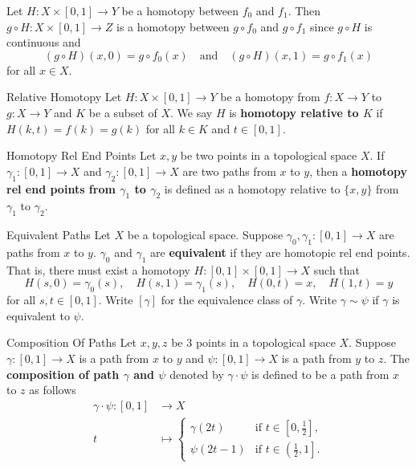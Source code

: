 \documentclass{report}
\begin{document}
\begin{prf}
	Let $H:X\times [0,1]\to Y$ be a homotopy between $f_0$ and $f_1$. Then $g\circ H:X\times [0,1]\to Z$ is a homotopy between $g\circ f_0$ and $g\circ f_1$ since $g\circ H$ is continuous and
	\[
		(g\circ H)(x,0)=g\circ f_0(x)\quad\text{and}\quad (g\circ H)(x,1)=g\circ f_1(x)
	\]
	for all $x\in X$.
\end{prf}

\begin{definition}{Relative Homotopy}{}
	Let $H: X \times[0,1] \rightarrow Y$ be a homotopy from $f:X\to Y$ to $g:X\to Y$ and $K$ be a subset of $X$. We say $H$ is \textbf{homotopy relative to $K$} if $H(k, t)=f(k)=g(k)$ for all $k \in K$ and $t \in[0,1]$.
\end{definition}

\begin{definition}{Homotopy Rel End Points}{}
	Let $x,y$ be two points in a topological space $X$. If $\gamma_1:[0,1]\to X$ and $\gamma_2:[0,1]\to X$ are two paths from $x$ to $y$, then a \textbf{homotopy rel end points from $\gamma_1$ to $\gamma_2$} is defined as a homotopy relative to $\{x, y\}$ from $\gamma_1$ to $\gamma_2$.
\end{definition}

\begin{definition}{Equivalent Paths}{}
	Let $X$ be a topological space. Suppose $\gamma_0,\gamma_1: [0,1] \longrightarrow X$ are paths from $x$ to $y$. $\gamma_0$ and $\gamma_1$ are \textbf{equivalent} if they are homotopic rel end points. That is, there must exist a homotopy $H: [0,1] \times [0,1] \longrightarrow X$ such that
	$$
		H(s, 0)=\gamma_0(s), \quad H(s, 1)=\gamma_1(s), \quad H(0, t)=x, \quad H(1, t)=y
	$$
	for all $s,t \in [0,1]$. Write $[\gamma]$ for the equivalence class of $\gamma$. Write $\gamma\sim \psi$ if $\gamma$ is equivalent to $\psi$.
\end{definition}


\begin{definition}{Composition Of Paths}{}
	Let $x,y,z$ be $3$ points in a topological space $X$. Suppose $\gamma: [0,1] \longrightarrow X$ is a path from $x$ to $y$ and $\psi: [0,1] \longrightarrow X$ is a path from $y$ to $z$. The \textbf{composition of path $\gamma$ and $\psi$} denoted by $\gamma\cdot \psi$ is defined to be a path from $x$ to $z$ as follows
	\begin{align*}
		\gamma\cdot \psi:[0,1] & \longrightarrow X                                                                            \\
		t                      & \longmapsto \begin{cases}
			                                     \gamma(2t) & \text{if }t\in\left[0,\frac{1}{2}\right],               \\
			                                     \psi(2t-1) & \text{if }t\in\left(\left.\frac{1}{2},1\right]\right. .
		                                     \end{cases}
	\end{align*}
\end{definition}
\end{document}
